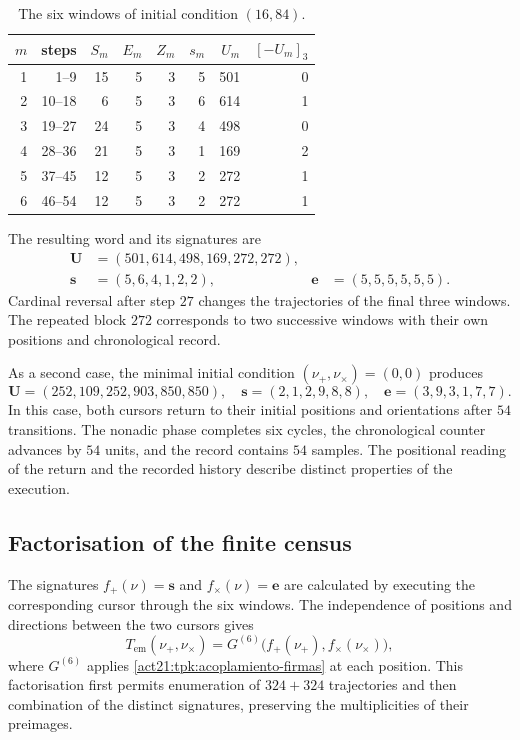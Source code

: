\begin{table}[htbp]
\caption{The six windows of initial condition \((16,84)\).}
\label{act21:tpk:tabla-seis501}
\begin{tabular}{@{}rrrrrrrr@{}}
\toprule
\(m\)&steps&\(S_m\)&\(E_m\)&\(Z_m\)&\(s_m\)&\(U_m\)&\([-U_m]_3\)\\
\midrule
1&1--9&15&5&3&5&501&0\\
2&10--18&6&5&3&6&614&1\\
3&19--27&24&5&3&4&498&0\\
4&28--36&21&5&3&1&169&2\\
5&37--45&12&5&3&2&272&1\\
6&46--54&12&5&3&2&272&1\\
\bottomrule
\end{tabular}
\end{table}

The resulting word and its signatures are
\begin{align*}
 \mathbf U&=(501,614,498,169,272,272),\\
 \mathbf s&=(5,6,4,1,2,2),&
 \mathbf e&=(5,5,5,5,5,5).
\end{align*}
Cardinal reversal after step \(27\) changes the trajectories of the final
three windows. The repeated block \(272\) corresponds to two successive
windows with their own positions and chronological record.

As a second case, the minimal initial condition
\((\nu_+,\nu_\times)=(0,0)\) produces
\[
 \mathbf U=(252,109,252,903,850,850),\quad
 \mathbf s=(2,1,2,9,8,8),\quad
 \mathbf e=(3,9,3,1,7,7).
\]
In this case, both cursors return to their initial positions and
orientations after \(54\) transitions. The nonadic phase completes six
cycles, the chronological counter advances by \(54\) units, and the
record contains \(54\) samples. The positional reading of the return and
the recorded history describe distinct properties of the execution.

\subsection{Factorisation of the finite census}
\label{act21:tpk:censo}

The signatures \(f_+(\nu)=\mathbf s\) and
\(f_\times(\nu)=\mathbf e\) are calculated by executing the corresponding
cursor through the six windows. The independence of positions and
directions between the two cursors gives
\begin{equation}
 T_{\mathrm{em}}(\nu_+,\nu_\times)
   =G^{(6)}\bigl(f_+(\nu_+),f_\times(\nu_\times)\bigr),
 \label{act21:tpk:factorizacion}
\end{equation}
where \(G^{(6)}\) applies \eqref{act21:tpk:acoplamiento-firmas} at each position.
This factorisation first permits enumeration of \(324+324\) trajectories
and then combination of the distinct signatures, preserving the
multiplicities of their preimages.

